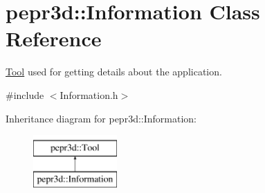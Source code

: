\hypertarget{classpepr3d_1_1_information}{}\section{pepr3d\+::Information Class Reference}
\label{classpepr3d_1_1_information}


\mbox{\hyperlink{classpepr3d_1_1_tool}{Tool}} used for getting details about the application.  




{\ttfamily \#include $<$Information.\+h$>$}

Inheritance diagram for pepr3d\+::Information\+:\begin{figure}[H]
\begin{center}
\leavevmode
\includegraphics[height=2.000000cm]{classpepr3d_1_1_information}
\end{center}
\end{figure}
